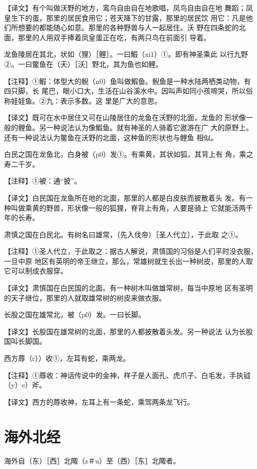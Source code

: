 \documentclass[a4paper,12pt,UTF8,twoside]{ctexbook}
\begin{document}
【译文】有个叫做沃野的地方，鸾鸟自由自在地歌唱，凤鸟自由自在地 舞蹈；凤皇生下的蛋，那里的居民食用它；苍天降下的甘露，那里的居民饮 用它：凡是他们所想要的都能随心如意。那里的各种野兽与人一起居住。沃 野在四条蛇的北面，那里的人用双手捧着凤皇蛋正在吃，有两只鸟在前面引 导着。

龙鱼陵居在其北，状如（狸）［鲤］。一曰鰕（xi1）①。即有神圣乘此 以行九野②。一曰鳖鱼在（夭）［沃］野北，其为鱼也如鲤。

【注释】①鰕：体型大的鲵（n0）鱼叫做鰕鱼。鲵鱼是一种水陆两栖类动物，有四只脚，长 尾巴，眼小口大，生活在山谷溪水中。因叫声如同小孩啼哭，所以俗称娃娃鱼。②九：表示多数。这 里是广大的意思。

【译文】既可在水中居住又可在山陵居住的龙鱼在沃野的北面，龙鱼的 形状像一般的鲤鱼。另一种说法认为像鰕鱼。就有神圣的人骑着它遨游在广 大的原野上。还有一种说法认为鳖鱼在沃野的北面，这种鱼的形状也与鲤鱼 相似。

白民之国在龙鱼北，白身被（p0）发①。有乘黄，其状如狐，其背上有 角，乘之寿二千岁。

【注释】①被：通“披”。

【译文】白民国在龙鱼所在地的北面，那里的人都是白皮肤而披散着头 发。有一种叫做乘黄的野兽，形状像一般的狐狸，脊背上有角，人要是骑上 它就能活两千年的长寿。

肃慎之国在白民北。有树名曰雄常，（先入伐帝）［圣人代立］，于此取 之①。

【注释】①圣人代立，于此取之：据古人解说，肃慎国的习俗是人们平时没衣服，一旦中原 地区有英明的帝王继立，那么，常雄树就生长出一种树皮，那里的人取它可以制成衣服穿。

【译文】肃慎国在白民国的北面。有一种树木叫做雄常树，每当中原地 区有圣明的天子继位，那里的人就取雄常树的树皮来做衣服。

长股之国在雄常北，被（p0）发。一曰长脚。

【译文】长股国在雄常树的北面，那里的人都披散着头发。另一种说法 认为长股国叫长脚国。

西方蓐（r））收①，左耳有蛇，乘两龙。

【注释】①蓐收：神话传说中的金神，样子是人面孔、虎爪子、白毛发，手执钺（y）e）斧。

【译文】西方的蓐收神，左耳上有一条蛇，乘驾两条龙飞行。

\chapter{海外北经}

海外自（东）［西］北陬（z＃u）至（西）［东］北陬者。
\end{document}
